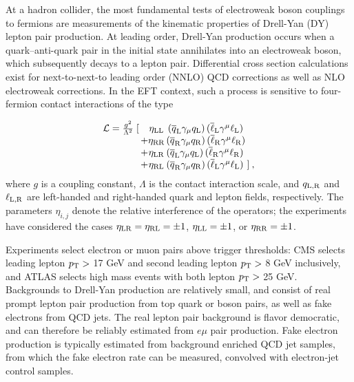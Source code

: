 At a hadron collider, the most fundamental tests of electroweak boson
couplings to fermions are measurements of the kinematic properties of
Drell-Yan (DY) lepton pair production.  At leading order, Drell-Yan
production occurs when a quark--anti-quark pair in the initial state
annihilates into an electroweak boson, which subsequently decays to a
lepton pair. Differential cross section calculations exist for
next-to-next-to leading order (NNLO) QCD corrections as well as NLO
electroweak corrections. In the EFT context, such a process is
sensitive to four-fermion contact interactions of the type

\begin{equation}\label{lagrangian}
\begin{array}{r@{\,}c@{}c@{\,}l@{\,}l}
\mathcal L = \frac{g^2}{\Lambda^2}\;[ && \eta_{\rm LL}&\, (\overline q_{\rm L}\gamma_{\mu} q_{\rm L})\,(\overline\ell_{\rm L}\gamma^{\mu}\ell_{\rm L}) \nonumber \\
& +&\eta_{\rm RR}& (\overline q_{\rm R}\gamma_{\mu} q_{\rm R}) \,(\overline\ell_{\rm R}\gamma^{\mu}\ell_{\rm R}) \\
&+&\eta_{\rm LR}& (\overline q_{\rm L}\gamma_{\mu} q_{\rm L}) \,(\overline\ell_{\rm R}\gamma^{\mu}\ell_{\rm R}) \\
&+&\eta_{\rm RL}& (\overline q_{\rm R}\gamma_{\mu} q_{\rm R}) \,(\overline\ell_{\rm L}\gamma^{\mu}\ell_{\rm L})& ] \: ,\nonumber
\end{array}
\end{equation}
where $g$ is a coupling constant, $\Lambda$ is the contact interaction scale,
and $q_{\rm L,R}$ and $\ell_{\rm L,R}$ are left-handed and right-handed quark and
lepton fields, respectively. The parameters $\eta_{i,j}$ denote the relative interference of the operators;
the experiments have considered the cases $\eta_{\rm LR} = \eta_{\rm RL} = \pm 1$,
$\eta_{\rm LL} = \pm 1$, or $\eta_{\rm RR} = \pm 1$.

Experiments select electron or muon pairs above trigger thresholds:
CMS selects leading lepton $p_{\mathrm{T}} >$ 17 GeV and second leading lepton
$p_{\mathrm{T}} >$ 8 GeV inclusively, and ATLAS selects high mass events with
both lepton $p_{\mathrm{T}} >$ 25 GeV.  Backgrounds to Drell-Yan production are
relatively small, and consist of real prompt lepton pair production
from top quark or boson pairs, as well as fake electrons from QCD
jets.  The real lepton pair background is flavor democratic, and can
therefore be reliably estimated from $e\mu$ pair production.  Fake
electron production is typically estimated from background enriched
QCD jet samples, from which the fake electron rate can be measured,
convolved with electron-jet control samples.

